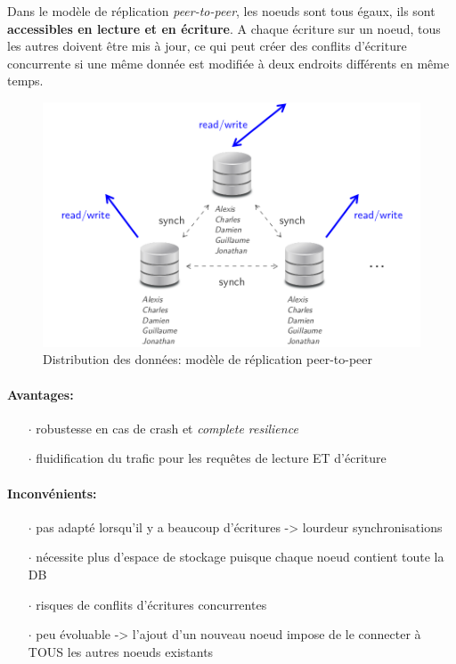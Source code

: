 \item{}
{\vrai}
{Dans le modèle de réplication \textit{peer-to-peer}, les noeuds sont tous égaux, ils sont \textbf{accessibles en lecture et en écriture}. A chaque écriture sur un noeud, tous les autres doivent être mis à jour, ce qui peut créer des conflits d'écriture concurrente si une même donnée est modifiée à deux endroits différents en même temps.
\begin{figure}[!h]
\center\includegraphics[scale=.3]{images/replication-peertopeer}
\caption{Distribution des données: modèle de réplication peer-to-peer \cite{ref1}}
\end{figure}

\paragraph{Avantages:}
\begin{itemize}
\item[$\cdot$]robustesse en cas de crash et \textit{complete resilience}
\item[$\cdot$]fluidification du trafic pour les requêtes de lecture ET d'écriture
\end{itemize}

\paragraph{Inconvénients:}
\begin{itemize}
\item[$\cdot$]pas adapté lorsqu'il y a beaucoup d'écritures -> lourdeur synchronisations
\item[$\cdot$]nécessite plus d'espace de stockage puisque chaque noeud contient toute la DB
\item[$\cdot$]risques de conflits d'écritures concurrentes
\item[$\cdot$]peu évoluable -> l'ajout d'un nouveau noeud impose de le connecter à TOUS les autres noeuds existants
\end{itemize}
}


